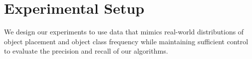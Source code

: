 \section{Experimental Setup}
\label{section:experimental_setup}


\par{
    We design our experiments to use data that mimics real-world distributions of object placement and object class frequency while maintaining sufficient control to evaluate the precision and recall of our algorithms. 
    
    }  
